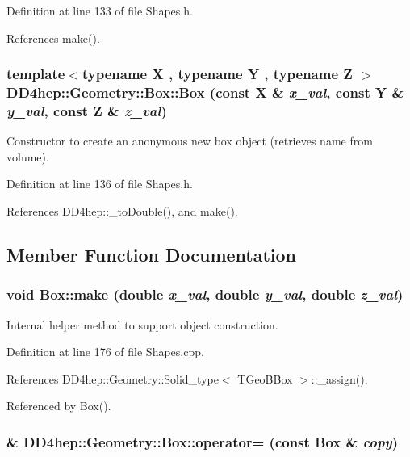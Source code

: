 Definition at line 133 of file Shapes.h.

References make().\hypertarget{class_d_d4hep_1_1_geometry_1_1_box_ae3862d860e87b005f22b62e9f82d5b51}{
\subsubsection[{Box}]{\setlength{\rightskip}{0pt plus 5cm}template$<$typename X , typename Y , typename Z $>$ DD4hep::Geometry::Box::Box (const X \& {\em x\_\-val}, \/  const Y \& {\em y\_\-val}, \/  const Z \& {\em z\_\-val})}}
\label{class_d_d4hep_1_1_geometry_1_1_box_ae3862d860e87b005f22b62e9f82d5b51}


Constructor to create an anonymous new box object (retrieves name from volume). 

Definition at line 136 of file Shapes.h.

References DD4hep::\_\-toDouble(), and make().

\subsection{Member Function Documentation}
\hypertarget{class_d_d4hep_1_1_geometry_1_1_box_a063e53830dac233cfbd25c20772fc634}{
\subsubsection[{make}]{\setlength{\rightskip}{0pt plus 5cm}void Box::make (double {\em x\_\-val}, \/  double {\em y\_\-val}, \/  double {\em z\_\-val})}}
\label{class_d_d4hep_1_1_geometry_1_1_box_a063e53830dac233cfbd25c20772fc634}


Internal helper method to support object construction. 

Definition at line 176 of file Shapes.cpp.

References DD4hep::Geometry::Solid\_\-type$<$ TGeoBBox $>$::\_\-assign().

Referenced by Box().\hypertarget{class_d_d4hep_1_1_geometry_1_1_box_a25b695cf830ce545da5718fef3505fd3}{
\subsubsection[{operator=}]{\& DD4hep::Geometry::Box::operator= (const {\bf Box} \& {\em copy})}}
\label{class_d_d4hep_1_1_geometry_1_1_box_a25b695cf830ce545da5718fef3505fd3}


